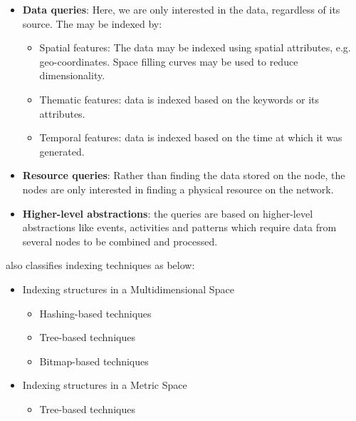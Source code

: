 \begin{itemize}
      \item \textbf{Data queries}: Here, we are only interested in the data,
            regardless of its source. The may be indexed by:
            \begin{itemize}
                  \item Spatial features: The data may be indexed using spatial
                        attributes, e.g. geo-coordinates. Space filling curves
                        may be used to reduce dimensionality.
                  \item Thematic features: data is indexed based on the keywords
                        or its attributes.
                  \item Temporal features: data is indexed based on the time at
                        which it was generated.
            \end{itemize}

      \item \textbf{Resource queries}: Rather than finding the data stored on
            the node, the nodes are only interested in finding a physical
            resource on the network.
      \item \textbf{Higher-level abstractions}: the queries are based on
            higher-level abstractions like events, activities and patterns which
            require data from several nodes to be combined and processed.
\end{itemize}

\citet{kouahlaSurveyBigIoT2022} also classifies indexing techniques as below:

\begin{itemize}
      \item Indexing structures in a Multidimensional Space
            \begin{itemize}
                  \item Hashing-based techniques
                  \item Tree-based techniques
                  \item Bitmap-based techniques
            \end{itemize}
      \item Indexing structures in a Metric Space
            \begin{itemize}
                  \item Tree-based techniques
            \end{itemize}
\end{itemize}

